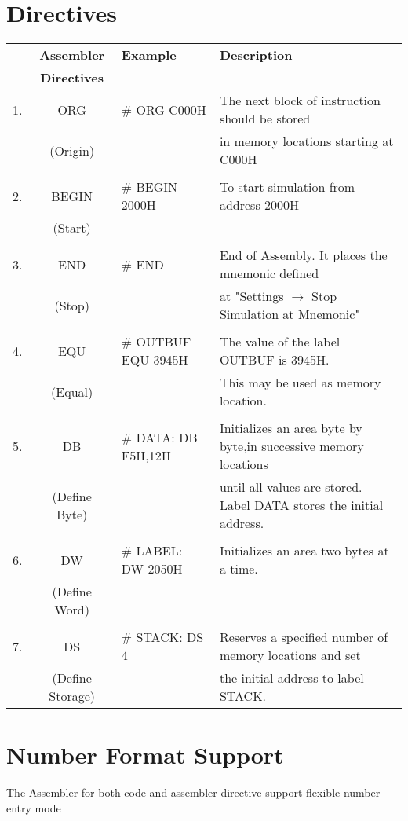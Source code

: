 \section{Directives}
\label{sec:asm:dir}
\begin{table}[htbp]
\centering
\begin{tabular}{lcll}
&\textbf{Assembler} & \textbf{Example} & \textbf{Description}\\
&\textbf{Directives} & &\\
1.&ORG & \# ORG C000H & The next block of instruction should be stored \\
&(Origin)&& in memory locations starting at C000H\\&&&\\
2. & BEGIN & \# BEGIN 2000H & To start simulation from address 2000H\\
&(Start)&&\\&&&\\
3. & END & \# END & End of Assembly. It places the mnemonic defined \\
&(Stop)&& at "Settings $ \rightarrow $ Stop Simulation at Mnemonic"\\&&&\\
4. & EQU & \# OUTBUF EQU 3945H & The value of the label OUTBUF is 3945H.\\
&(Equal)&& This may be used as memory location.\\&&&\\
5.& DB & \# DATA: DB F5H,12H & Initializes an area byte by byte,in successive memory locations\\
&(Define Byte)&&  until all values are  stored. Label DATA stores the initial address.\\&&&\\
6.& DW & \# LABEL: DW 2050H & Initializes an area two bytes at a time.\\
&(Define Word)&&\\&&&\\
7. & DS & \# STACK: DS 4 & Reserves a specified number of memory locations and set\\
&(Define Storage)&& the initial address to label STACK.
\end{tabular}
\end{table}

\pagebreak
\section{Number Format Support}
The Assembler for both code and assembler directive support flexible number entry mode

